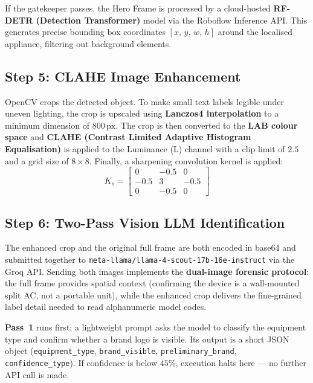 If the gatekeeper passes, the Hero Frame is processed by a cloud-hosted \textbf{RF-DETR (Detection Transformer)} model via the Roboflow Inference API. This generates precise bounding box coordinates $[x,\,y,\,w,\,h]$ around the localised appliance, filtering out background elements.

\subsection{Step 5: CLAHE Image Enhancement}

OpenCV crops the detected object. To make small text labels legible under uneven lighting, the crop is upscaled using \textbf{Lanczos4 interpolation} to a minimum dimension of $800\,\text{px}$. The crop is then converted to the \textbf{LAB colour space} and \textbf{CLAHE (Contrast Limited Adaptive Histogram Equalisation)} is applied to the Luminance (L) channel with a clip limit of $2.5$ and a grid size of $8\times8$. Finally, a sharpening convolution kernel is applied:
\begin{equation}
  K_s = \begin{bmatrix} 0 & -0.5 & 0 \\ -0.5 & 3 & -0.5 \\ 0 & -0.5 & 0 \end{bmatrix}
\end{equation}

\subsection{Step 6: Two-Pass Vision LLM Identification}

The enhanced crop and the original full frame are both encoded in base64 and submitted together to \texttt{meta-llama/llama-4-scout-17b-16e-instruct} via the Groq API. Sending both images implements the \textbf{dual-image forensic protocol}: the full frame provides spatial context (confirming the device is a wall-mounted split AC, not a portable unit), while the enhanced crop delivers the fine-grained label detail needed to read alphanumeric model codes.

\textbf{Pass~1} runs first: a lightweight prompt asks the model to classify the equipment type and confirm whether a brand logo is visible. Its output is a short JSON object (\texttt{equipment\_type}, \texttt{brand\_visible}, \texttt{preliminary\_brand}, \texttt{confidence\_type}). If confidence is below $45\%$, execution halts here — no further API call is made.

